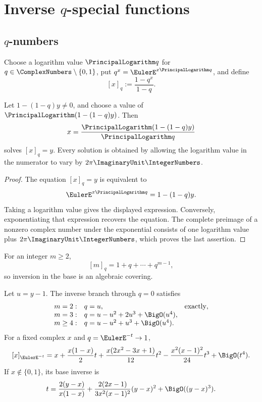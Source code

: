 \chapter{Inverse \texorpdfstring{\(q\)}{q}-special functions}
\label{chap:inverse-q-special-functions}

\section{\texorpdfstring{\(q\)-numbers}{q-numbers}}
\label{sec:qs-qnumbers}

Choose a logarithm value \(\PrincipalLogarithm q\) for \(q\in\ComplexNumbers\setminus\{0,1\}\), put
\(q^x=\EulerE^{x\PrincipalLogarithm q}\), and define
\[
  [x]_q:=\frac{1-q^x}{1-q}.
\]

\begin{proposition}
\label{prop:qs-qnumber-x}
Let \(1-(1-q)y\ne0\), and choose a value of
\(\PrincipalLogarithm(1-(1-q)y)\).  Then
\[
  x=\frac{\PrincipalLogarithm(1-(1-q)y)}{\PrincipalLogarithm q}
\]
solves \([x]_q=y\).  Every solution is obtained by allowing the logarithm
value in the numerator to vary by \(2\pi\ImaginaryUnit\IntegerNumbers\).
\end{proposition}

\begin{proof}
The equation \([x]_q=y\) is equivalent to
\[
  \EulerE^{x\PrincipalLogarithm q}=1-(1-q)y.
\]
Taking a logarithm value gives the displayed expression.  Conversely,
exponentiating that expression recovers the equation.  The complete
preimage of a nonzero complex number under the exponential consists of one
logarithm value plus \(2\pi\ImaginaryUnit\IntegerNumbers\), which proves the last assertion.
\end{proof}

For an integer \(m\ge2\),
\[
  [m]_q=1+q+\cdots+q^{m-1},
\]
so inversion in the base is an algebraic covering.

\begin{proposition}
\label{prop:qs-qnumber-jets}
Let \(u=y-1\).  The inverse branch through \(q=0\) satisfies
\[
\begin{array}{rll}
 m=2:&q=u,&\text{exactly},\\
 m=3:&q=u-u^2+2u^3+\BigO(u^4),&\\
 m\ge4:&q=u-u^2+u^3+\BigO(u^4).&
\end{array}
\]
For a fixed complex \(x\) and \(q=\EulerE^{-t}\to1\),
\[
  [x]_{\EulerE^{-t}}
  =x+\frac{x(1-x)}2t
   +\frac{x(2x^2-3x+1)}{12}t^2
   -\frac{x^2(x-1)^2}{24}t^3+\BigO(t^4).
\]
If \(x\notin\{0,1\}\), its base inverse is
\[
  t=\frac{2(y-x)}{x(1-x)}
   +\frac{2(2x-1)}{3x^2(x-1)^2}(y-x)^2
   +\BigO((y-x)^3).
\]
\end{proposition}

